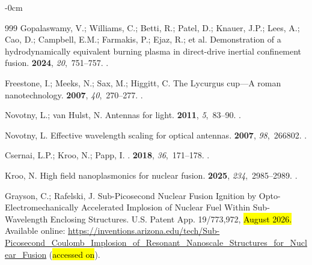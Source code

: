 \documentclass[particles,article,accept,pdftex,moreauthors]{Definitions/mdpi}
\begin{document}
\begin{adjustwidth}{-\extralength}{0cm}
\begin{thebibliography}{999}
Gopalaswamy, V.; Williams, C.;  Betti, R.; Patel, D.; Knauer, J.P.; Lees, A.; Cao, D.; Campbell, E.M.; Farmakis, P.; Ejaz, R.; et al.
\newblock Demonstration of a hydrodynamically equivalent burning plasma in
  direct-drive inertial confinement fusion.
 {\bf 2024}, {\em 20},~751--757.
.

Freestone, I.; Meeks, N.;  Sax, M.; Higgitt, C.
\newblock The Lycurgus cup—A roman nanotechnology.
 {\bf 2007}, {\em 40},~270--277.
.

Novotny, L.; van Hulst, N.
\newblock Antennas for light.
 {\bf 2011}, {\em 5},~83--90.
.

Novotny, L.
\newblock Effective wavelength scaling for optical antennas.
 {\bf 2007}, {\em 98},~266802.
.

{Csernai}, L.P.; {Kroo}, N.;  Papp, I.
.
 {\bf 2018}, {\em 36},~171--178.
.

Kroo, N.
\newblock High field nanoplasmonics for nuclear fusion.
 {\bf 2025}, {\em 234},~2985--2989.
.

Grayson, C.; Rafelski, J.
\newblock Sub-Picosecond Nuclear Fusion Ignition by Opto-Electromechanically
  Accelerated Implosion of Nuclear Fuel Within Sub-Wavelength Enclosing
  Structures.
\newblock  U.S. Patent App. 19/773,972,  \hl{August 2026.} %
\newblock
 Available online:  \url{https://inventions.arizona.edu/tech/Sub-Picosecond_Coulomb_Implosion_of_Resonant_Nanoscale_Structures_for_Nuclear_Fusion} (\hl{accessed on}).


\end{thebibliography}
\end{adjustwidth}
\end{document}
